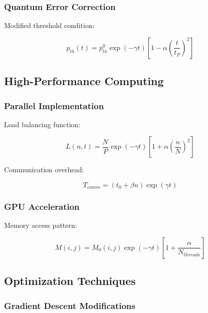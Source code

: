 \documentclass[12pt]{article}
\theoremstyle{plain}
\theoremstyle{definition}
\theoremstyle{remark}
\begin{document}
\subsubsection{Quantum Error Correction}

Modified threshold condition:

\begin{equation}
p_{th}(t) = p_{th}^0\exp(-\gamma t)\left[1 - \alpha\left(\frac{t}{t_P}\right)^2\right]
\end{equation}

\subsection{High-Performance Computing}

\subsubsection{Parallel Implementation}

Load balancing function:

\begin{equation}
L(n,t) = \frac{N}{P}\exp(-\gamma t)\left[1 + \alpha\left(\frac{n}{N}\right)^2\right]
\end{equation}

Communication overhead:

\begin{equation}
T_{comm} = (t_0 + \beta n)\exp(\gamma t)
\end{equation}

\subsubsection{GPU Acceleration}

Memory access pattern:

\begin{equation}
M(i,j) = M_0(i,j)\exp(-\gamma t)\left[1 + \frac{\alpha}{N_{threads}}\right]
\end{equation}

\subsection{Optimization Techniques}

\subsubsection{Gradient Descent Modifications}
\end{document}

